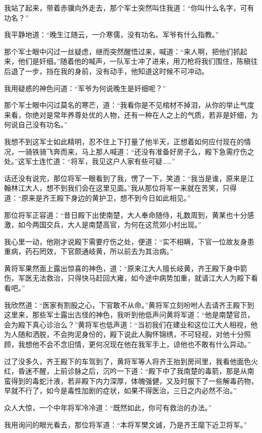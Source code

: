 我站了起来，带着赤骥向外走去，那个军士突然叫住我道：“你叫什么名字，可有功名？”

我平静地道：“晚生江随云，一介寒儒，没有功名。军爷有什么指教。”

那个军士眼中闪过一丝疑虑，继而突然醒悟过来，喊道：“来人啊，把他们抓起来，他们是奸细。”随着他的喊声，一队军士冲了进来，用刀枪将我们围住，陈稹往后退了一步，挡在我的身前，没有动手，他知道这时候不可冲动。

我用疑惑的神色问道：“军爷为何说晚生是奸细呢？”

那个军士眼中闪过莫名的寒芒，道：“我看你是不见棺材不掉泪，从你的举止气度来看，你绝对是常年养尊处优的人物，还有一种在人之上的气质，若非是奸细，为何说自己没有功名。”

我想不到这军士如此精明，忍不住上下打量了他半天，正想着如何应付现在的情况，一骑铁骑飞奔而来，马上那人喊道：“还没有准备好房子么，殿下急需疗伤之处。”这军士连忙道：“将军，我见这户人家有些可疑……”

话还没有说完，那位将军一眼看到了我，愣了一下，笑道：“我当是谁，原来是江翰林江大人，想不到我们会在这里见面。”我从那位将军一来就在苦笑，只得道：“原来是齐王殿下身边的黄护卫，想不到今日如此相见。”

那位将军正容道：“昔日殿下出使南楚，大人奉命随侍，礼数周到，黄某也十分感激，如今两国交兵，大人是南楚高官，为何在这荒郊小村出现。”

我心里一动，他刚才说殿下需要疗伤之处，便道：“实不相瞒，下官一位故友身患重病，药石罔效，下官颇通岐黄，所以前去为其治病。”

黄将军果然面上露出惊喜的神色，道：“原来江大人擅长岐黄，齐王殿下身中箭伤，军医无法救治，只得快马赶回大雍，如今途中病势加重，就请江大人为殿下看看吧。”

我欣然道：“医家有割股之心，下官敢不从命。”黄将军立刻吩咐人去请齐王殿下到这里来，那些军士露出古怪的神色，我听到他低声问黄将军道：“他是南楚官员，会为殿下真心诊治么？”黄将军也低声道：“当初我们在建业和这位江大人相视，他为人随和洒脱，不会拘泥身份的，殿下说此人胸怀锦绣，不可轻视，对他十分照顾，我想他不会不念旧情，更何况现在他在我军手上，谅他也不敢有什么异动。”

过了没多久，齐王殿下的车驾到了，黄将军等人将齐王抬到房间里，我看他面色火红，昏迷不醒，上前诊脉之后，沉吟一下道：“殿下中了我南楚的毒箭，那是从南蛮得到的毒蛇汁液，若非殿下内力深厚，体魄强健，又及时服下了一些解毒药物，早就不行了，如今是毒性加剧的症状，如果不得医治，三日之内必然不治。”

众人大惊，一个中年将军冷冷道：“既然如此，你可有救治的办法。”

我用询问的眼光看去，那位将军道：“本将军樊文诚，乃是齐王麾下近卫将军。”

